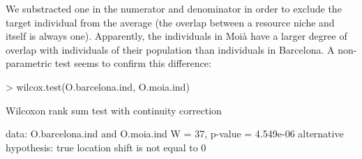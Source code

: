 \documentclass[11pt,a4paper]{article}
\begin{document}
We substracted one in the numerator and denominator in order to exclude the target individual from the average (the overlap between a resource niche and itself is always one). Apparently, the individuals in Moià have a larger degree of overlap with individuals of their population than individuals in Barcelona. A non-parametric test seems to confirm this difference:
\begin{Schunk}
\begin{Sinput}
> wilcox.test(O.barcelona.ind, O.moia.ind)
\end{Sinput}
\begin{Soutput}
	Wilcoxon rank sum test with continuity correction

data:  O.barcelona.ind and O.moia.ind
W = 37, p-value = 4.549e-06
alternative hypothesis: true location shift is not equal to 0
\end{Soutput}
\end{Schunk}



\end{document}
